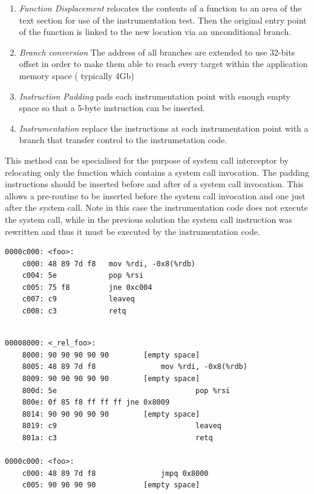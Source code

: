 \begin{enumerate}

\item \emph{Function Displacement} relocates the contents of a function to an area of the text section for use of the instrumentation test. Then the original entry point of the 									   function is linked to the new location via an unconditional branch.   
\item \emph{Branch conversion}	   The address of all branches are extended to use 32-bits offset in order to make them able to reach every target within the application memory 									   space ( typically 4Gb)  
\item \emph{Instruction Padding}   pads each instrumentation point with enough empty space so that a 5-byte instruction can be inserted.  
\item \emph{Instrumentation}	   replace the instructions at each instrumentation point with a branch that transfer control to the instrumetation code. 

\end{enumerate}

This method can be specialised for the purpose of system call interceptor by relocating only the function which contains a system call invocation. The padding instructions should be inserted before and after of a system call invocation. This allows a pre-routine to be inserted before the system call invocation and one just after the system call. Note in this case the instrumentation code does not execute the system call, while in the previous solution the system call instruction was rewritten and thus it must be executed by the instrumentation code. 


\begin{center}
\lstset{escapechar=@,style=asm}
\begin{lstlisting}[caption={Original instructions, x64 architecture}]
   	0000c000: <foo>: 
   	c000: 48 89 7d f8	mov %rdi, -0x8(%rdb)
   	c004: 5e			pop %rsi
   	c005: 75 f8			jne 0xc004
   	c007: c9			leaveq	
   	c008: c3			retq
   	
\end{lstlisting}
\end{center}

\begin{center}
\lstset{escapechar=@,style=asm}
\begin{lstlisting}[caption={Instructions after the rewriting process using a relocation code approach at functional level}]
00008000: <_rel_foo>: 
    8000: 90 90 90 90 90		[empty space]
   	8005: 48 89 7d f8				mov %rdi, -0x8(%rdb)
   	8009: 90 90 90 90 90 		[empty space]
   	800d: 5e								pop %rsi
   	800e: 0f 85 f8 ff ff ff	jne 0x8009
   	8014: 90 90 90 90 90 		[empty space]
   	8019: c9								leaveq	
   	801a: c3								retq

0000c000: <foo>: 
   	c000: 48 89 7d f8				jmpq 0x8000
   	c005: 90 90 90 90 			[empty space]
\end{lstlisting}
\end{center}


